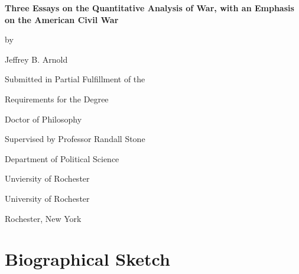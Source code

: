 \documentclass[12pt,oneside]{book}\usepackage[]{graphicx}\usepackage[]{color}
\newcommand{\myauthor}{Jeffrey B. Arnold}
\newcommand{\myinstitution}{University of Rochester}
\newcommand{\mylocation}{Rochester, New York}
\newcommand{\mytitle}{Three Essays on the Quantitative Analysis of War, with an Emphasis on the American Civil War}
\newcommand{\myadvisor}{Professor Randall Stone}
\newcommand{\myadvisorinstitution}{Unviersity of Rochester}
\newcommand{\myadvisordept}{Department of Political Science}
\newcommand{\myyear}{2016}
\begin{document}
\begin{titlepage}
  \vspace*{\fill}

  \begin{center}
    {\LARGE \bfseries \mytitle \par}

    \bigskip%
    by

    \bigskip%
    \myauthor


    \bigskip\bigskip\bigskip\bigskip%
    Submitted in Partial Fulfillment of the

    \bigskip%
    Requirements for the Degree

    \bigskip%
    Doctor of Philosophy


    \bigskip\bigskip\bigskip\bigskip%
    Supervised by \myadvisor{}

    \bigskip\bigskip%
    \myadvisordept{}

    \bigskip%
    \myadvisorinstitution{}


    \bigskip\bigskip\bigskip\bigskip%
    \myinstitution

    \bigskip%
    \mylocation{}


    \bigskip\bigskip\bigskip\bigskip%
    \myyear{}
  \end{center}

  \vspace*{\fill}
\end{titlepage}



\pagestyle{fancy}
\setcounter{page}{2}
\doublespacing


\thispagestyle{plain}
\begin{center}
  \vspace*{\fill}
  \it%
  
  \vspace*{\fill}
\end{center}

\clearpage


\chapter*{Biographical Sketch}

\end{document}
